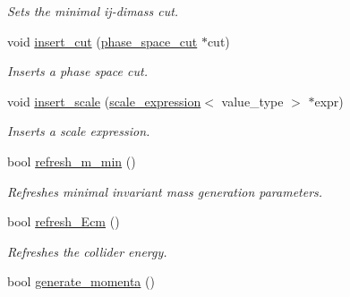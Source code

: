 \begin{DoxyCompactItemize}
\begin{DoxyCompactList}\small\item\em Sets the minimal ij-\/dimass cut. \end{DoxyCompactList}\item 
\hypertarget{a00430_a0f7e2e6245e29ba4f90b80368d3baf61}{void \hyperlink{a00430_a0f7e2e6245e29ba4f90b80368d3baf61}{insert\-\_\-cut} (\hyperlink{a00413}{phase\-\_\-space\-\_\-cut} $\ast$cut)}\label{a00430_a0f7e2e6245e29ba4f90b80368d3baf61}

\begin{DoxyCompactList}\small\item\em Inserts a phase space cut. \end{DoxyCompactList}\item 
\hypertarget{a00430_ab6bfad8e3fd161695f067475bdb844c0}{void \hyperlink{a00430_ab6bfad8e3fd161695f067475bdb844c0}{insert\-\_\-scale} (\hyperlink{a00489}{scale\-\_\-expression}$<$ value\-\_\-type $>$ $\ast$expr)}\label{a00430_ab6bfad8e3fd161695f067475bdb844c0}

\begin{DoxyCompactList}\small\item\em Inserts a scale expression. \end{DoxyCompactList}\item 
\hypertarget{a00430_a5dc7872eef01e7c3efa428b1de7474f1}{bool \hyperlink{a00430_a5dc7872eef01e7c3efa428b1de7474f1}{refresh\-\_\-m\-\_\-min} ()}\label{a00430_a5dc7872eef01e7c3efa428b1de7474f1}

\begin{DoxyCompactList}\small\item\em Refreshes minimal invariant mass generation parameters. \end{DoxyCompactList}\item 
\hypertarget{a00430_a3cfaa193508bb8b66508907cd78aa1ad}{bool \hyperlink{a00430_a3cfaa193508bb8b66508907cd78aa1ad}{refresh\-\_\-\-Ecm} ()}\label{a00430_a3cfaa193508bb8b66508907cd78aa1ad}

\begin{DoxyCompactList}\small\item\em Refreshes the collider energy. \end{DoxyCompactList}\item 
\hypertarget{a00430_a50a8b49e917532fd9eef3a6c4d92af26}{bool \hyperlink{a00430_a50a8b49e917532fd9eef3a6c4d92af26}{generate\-\_\-momenta} ()}\label{a00430_a50a8b49e917532fd9eef3a6c4d92af26}


\end{DoxyCompactItemize}
